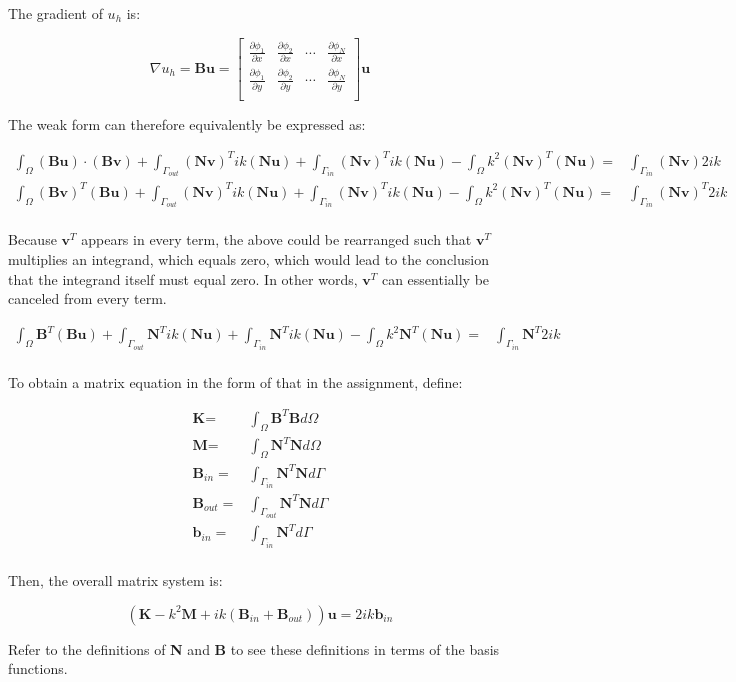 \documentclass[10pt]{article}
\newcommand{\beq}{\begin{equation}}
\newcommand{\eeq}{\end{equation}}
\newcommand{\beqa}{\begin{equation}\begin{aligned}}
\newcommand{\eeqa}{\end{aligned}\end{equation}}
\begin{document}
The gradient of \(u_h\) is:

\beq
\nabla u_h=\textbf{B}\textbf{u}=\begin{bmatrix} 
\frac{\partial \phi_1}{\partial x} & \frac{\partial \phi_2}{\partial x} & \cdots & \frac{\partial \phi_N}{\partial x}\\
\frac{\partial \phi_1}{\partial y} & \frac{\partial \phi_2}{\partial y} & \cdots & \frac{\partial \phi_N}{\partial y}\\
\end{bmatrix}\textbf{u}
\eeq

The weak form can therefore equivalently be expressed as:

\beqa
\int_{\Omega}(\textbf{B}\textbf{u})\cdot(\textbf{B}\textbf{v})+\int_{\Gamma_{out}}(\textbf{N}\textbf{v})^Tik(\textbf{N}\textbf{u})+\int_{\Gamma_{in}}(\textbf{N}\textbf{v})^Tik(\textbf{N}\textbf{u})-\int_{\Omega}k^2(\textbf{N}\textbf{v})^T(\textbf{N}\textbf{u})=&\int_{\Gamma_{in}}(\textbf{N}\textbf{v})2ik\\
\int_{\Omega}(\textbf{B}\textbf{v})^T(\textbf{B}\textbf{u})+\int_{\Gamma_{out}}(\textbf{N}\textbf{v})^Tik(\textbf{N}\textbf{u})+\int_{\Gamma_{in}}(\textbf{N}\textbf{v})^Tik(\textbf{N}\textbf{u})-\int_{\Omega}k^2(\textbf{N}\textbf{v})^T(\textbf{N}\textbf{u})=&\int_{\Gamma_{in}}(\textbf{N}\textbf{v})^T2ik\\
\eeqa

Because \(\textbf{v}^T\) appears in every term, the above could be rearranged such that \(\textbf{v}^T\) multiplies an integrand, which equals zero, which would lead to the conclusion that the integrand itself must equal zero. In other words, \(\textbf{v}^T\) can essentially be canceled from every term.

\beqa
\int_{\Omega}\textbf{B}^T(\textbf{B}\textbf{u})+\int_{\Gamma_{out}}\textbf{N}^Tik(\textbf{N}\textbf{u})+\int_{\Gamma_{in}}\textbf{N}^Tik(\textbf{N}\textbf{u})-\int_{\Omega}k^2\textbf{N}^T(\textbf{N}\textbf{u})=&\int_{\Gamma_{in}}\textbf{N}^T2ik\\
\eeqa

To obtain a matrix equation in the form of that in the assignment, define:

\beqa
\textbf{K}=&\int_{\Omega}\textbf{B}^T\textbf{B}d\Omega\\
\textbf{M}=&\int_{\Omega}\textbf{N}^T\textbf{N}d\Omega\\
\textbf{B}_{in}=&\int_{\Gamma_{in}}\textbf{N}^T\textbf{N}d\Gamma\\
\textbf{B}_{out}=&\int_{\Gamma_{out}}\textbf{N}^T\textbf{N}d\Gamma\\
\textbf{b}_{in}=&\int_{\Gamma_{in}}\textbf{N}^Td\Gamma\\
\eeqa

Then, the overall matrix system is:

\beq
\left(\textbf{K}-k^2\textbf{M}+ik(\textbf{B}_{in}+\textbf{B}_{out})\right)\textbf{u}=2ik\textbf{b}_{in}
\eeq

Refer to the definitions of \textbf{N} and \textbf{B} to see these definitions in terms of the basis functions.
\end{document}
